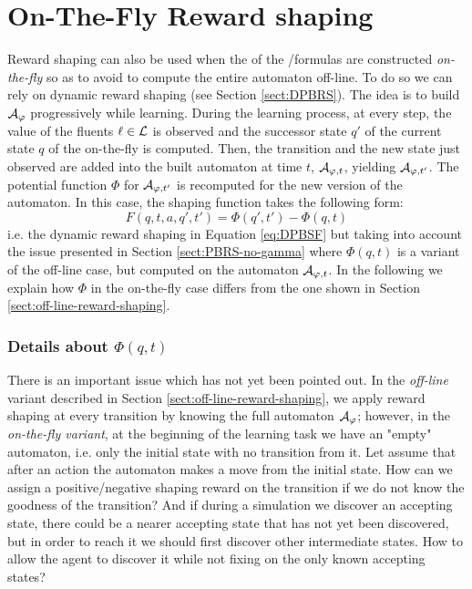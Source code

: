 \section{On-The-Fly Reward shaping }
Reward shaping can also be used when the \DFAs of the \LTLf /\LDLf formulas are constructed \emph{on-the-fly} \citep{AAAI1817342} so as to avoid to compute the entire automaton off-line. To do so we can rely on dynamic reward shaping (see Section \ref{sect:DPBRS}).
The idea is to build $\mathcal{A}_{\varphi}$ progressively while learning. During the learning process, at every step, the value of the fluents $\ell \in \mathcal{L}$ is observed and the successor state $q'$ of the current state $q$ of the \DFA on-the-fly is computed. 
Then, the transition and the new state just observed are added into the built automaton at time $t$, $\mathcal{A}_{\varphi, t}$, yielding $\mathcal{A}_{\varphi, t'}$. The potential function $\Phi$ for $\mathcal{A}_{\varphi, t'}$ is recomputed for the new version of the automaton. In this case, the shaping function takes the following form: 
\begin{equation}
F(q, t, a, q', t') = \Phi(q', t') - \Phi(q, t)
\end{equation}
i.e. the dynamic reward shaping in Equation \ref{eq:DPBSF} but taking into account the issue presented in Section \ref{sect:PBRS-no-gamma}
where $\Phi(q, t)$ is a variant of the off-line case, but computed on the automaton $\mathcal{A}_{\varphi, t}$. In the following we explain how $\Phi$ in the on-the-fly case differs from the one shown in Section \ref{sect:off-line-reward-shaping}.

\subsubsection{Details about $\Phi(q, t)$}
There is an important issue which has not yet been pointed out. In the \emph{off-line} variant described in Section \ref{sect:off-line-reward-shaping}, we apply reward shaping at every transition by knowing the full automaton $\mathcal{A}_\varphi$; however, in the \emph{on-the-fly variant}, at the beginning of the learning task we have an "empty" automaton, i.e. only the initial state with no transition from it. 
Let assume that after an action the automaton makes a move from the initial state. How can we assign a positive/negative shaping reward on the transition if we do not know the goodness of the transition?
And if during a simulation we discover an accepting state, there could be a nearer accepting state that has not yet been discovered, but in order to reach it we should first discover other intermediate states. How to allow the agent to discover it while not fixing on the only known accepting states?

